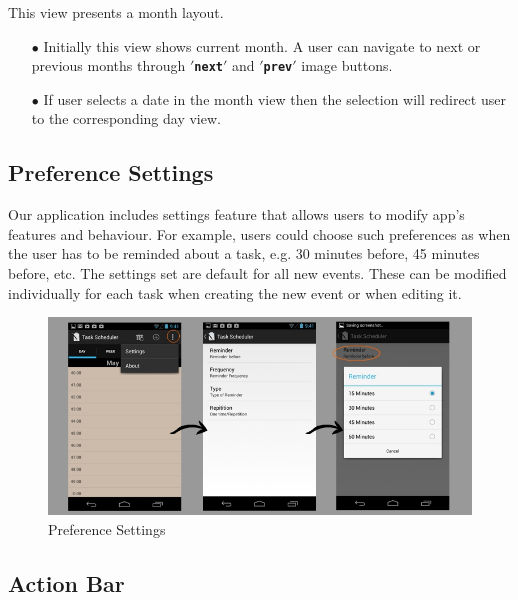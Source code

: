 \documentclass[10pt,a4paper]{report}
\begin{document}
This view presents a month layout.

\begin{itemize}
  \item[$\bullet$] Initially this view shows current month. A user can navigate to next or previous months through \textbf{\texttt{$'$next$'$}} and \textbf{\texttt{$'$prev$'$}} image buttons.
  \item[$\bullet$] If user selects a date in the month view then the selection will redirect user to the corresponding day view.
\end{itemize}

\subsection{Preference Settings}
Our application includes settings feature that allows users to modify app's features and behaviour. For example, users could choose such preferences as when the user has to be reminded about a task, e.g. 30 minutes before, 45 minutes before, etc. The settings set are default for all new events. These can be modified individually for each task when creating the new event or when editing it.\\


\begin{figure}[h!]
\begin{center}
\includegraphics[scale=0.5]{settings.jpg}  
\end{center}
\caption{Preference Settings}
\label{hd}
\end{figure}

\subsection{Action Bar}
\end{document}
